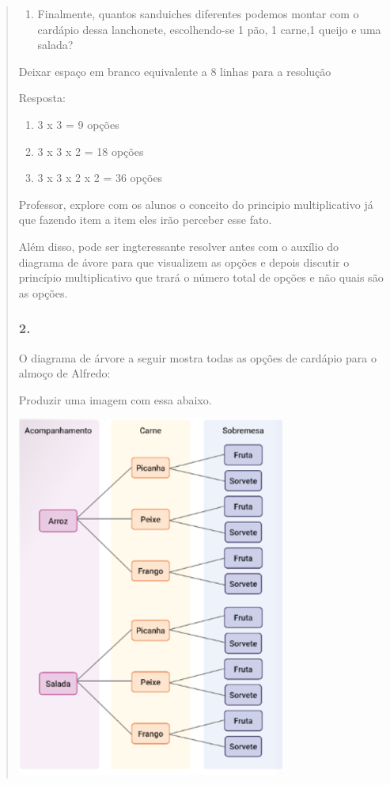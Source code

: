 \begin{enumerate}
\begin{escolha}
\begin{enumerate}
\begin{itemize}
\begin{itemize}
\begin{escolha}
\begin{quote}
\begin{escolha}
{\begin{enumerate}
\def\labelenumi{\alph{enumi})}
\item
  Finalmente, quantos sanduiches diferentes podemos montar com o
  cardápio dessa lanchonete, escolhendo-se 1 pão, 1 carne,1 queijo e uma
  salada?
\end{enumerate}

Deixar espaço em branco equivalente a 8 linhas para a resolução

Resposta:

\begin{enumerate}
\def\labelenumi{\alph{enumi})}
\item
  3 x 3 = 9 opções
\item
  3 x 3 x 2 = 18 opções
\item
  3 x 3 x 2 x 2 = 36 opções
\end{enumerate}

Professor, explore com os alunos o conceito do principio multiplicativo
já que fazendo item a item eles irão perceber esse fato.

Além disso, pode ser ingteressante resolver antes com o auxílio do
diagrama de ávore para que visualizem as opções e depois discutir o
princípio multiplicativo que trará o número total de opções e não quais
são as opções.

\subsubsection{2.}\label{section-131}

O diagrama de árvore a seguir mostra todas as opções de cardápio para o
almoço de Alfredo:

Produzir uma imagem com essa abaixo.

\includegraphics[width=3.46697in,height=4.68374in]{media/image138.png}

}
\end{escolha}
\end{quote}
\end{escolha}
\end{itemize}
\end{itemize}
\end{enumerate}
\end{escolha}
\end{enumerate}
